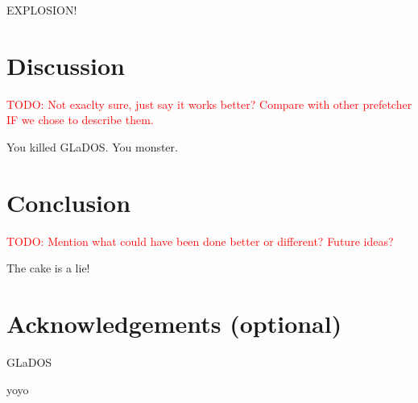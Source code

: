 \documentclass[a4paper]{IEEEtran}
\newcommand\TODO[1]{\textcolor{red}{TODO:#1}}
\newcommand\todo[1]{\TODO{#1}}
\begin{document}
EXPLOSION!
\section{Discussion}
\todo{ Not exaclty sure, just say it works better? Compare with other prefetcher IF we chose to describe them. }
\break


You killed GLaDOS.
You monster.
\section{Conclusion}
\todo{ Mention what could have been done better or different? Future ideas? }
\break

The cake is a lie!
\section{Acknowledgements (optional)}
GLaDOS

yoyo \cite{assignment-text}



\nocite{*}
\end{document}

